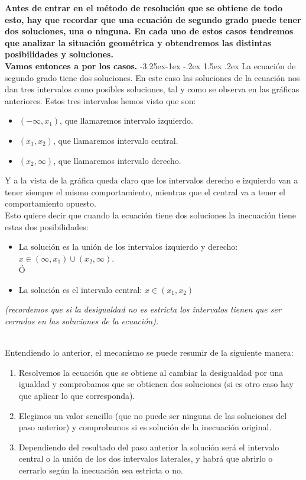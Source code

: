 \documentclass[a4paper,11pt,answers]{exam}
\makeatletter
\renewcommand\paragraph{\@startsection{paragraph}{4}{\z@}%
                                     {-3.25ex\@plus -1ex \@minus -.2ex}%
                                     {1.5ex \@plus .2ex}%
                                     {\normalfont\normalsize\bfseries}}
\makeatother
\begin{document}
\textbf{Antes de entrar en el método de resolución que se obtiene de todo esto, hay que recordar que
una ecuación de segundo grado puede tener dos soluciones, una o ninguna. En cada uno de estos
casos tendremos que analizar la situación geométrica y obtendremos las distintas posibilidades y
soluciones.\\
Vamos entonces a por los casos.}
\paragraph{La ecuación de segundo grado tiene dos soluciones.}
En este caso las soluciones de la ecuación nos dan tres intervalos como posibles soluciones, tal
y como se observa en las gráficas anteriores. Estos tres intervalos hemos visto que son:
\begin{itemize}
\item $(-\infty, x_1)$, que llamaremos intervalo izquierdo.
\item $(x_1, x_2)$, que llamaremos intervalo central.
\item $(x_2, \infty)$, que llamaremos intervalo derecho.
\end{itemize}

Y a la vista de la gráfica queda claro que los intervalos derecho e izquierdo van a tener siempre
el mismo comportamiento, mientras que el central va a tener el comportamiento opuesto.\\
Esto quiere decir que cuando la ecuación tiene dos soluciones la inecuación tiene estas dos posibilidades:
\begin{itemize}
\item La solución es la unión de los intervalos izquierdo y derecho: $x \in (\infty, x_1) \cup
  (x_2, \infty)$.\\
  
  Ó
  
\item La solución es el intervalo central: $x \in (x_1, x_2)$
\end{itemize}
\begin{small}\emph{(recordemos que si la desigualdad no es estricta los intervalos tienen que ser
    cerrados en las soluciones de la ecuación).}\end{small}\\

Entendiendo lo anterior, el mecanismo se puede resumir de la siguiente manera:
\begin{enumerate}
\item Resolvemos la ecuación que se obtiene al cambiar la desigualdad por una igualdad y
  comprobamos que se obtienen dos soluciones (si es otro caso hay que aplicar lo que corresponda).
\item Elegimos un valor sencillo (que no puede ser ninguna de las soluciones del paso anterior)
  y comprobamos si es solución de la inecuación original.
\item Dependiendo del resultado del paso anterior la solución será el intervalo central o la
  unión de los dos intervalos laterales, y habrá que abrirlo o cerrarlo según la inecuación sea
  estricta o no.
\end{enumerate}
\end{document}
